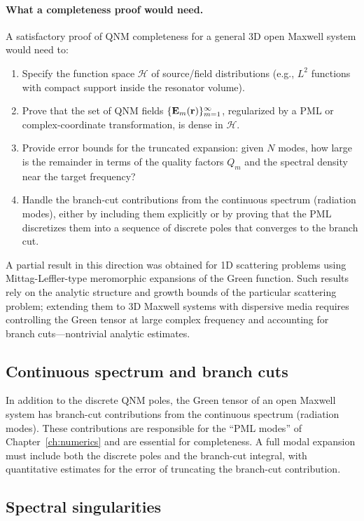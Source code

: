 \paragraph{What a completeness proof would need.}
A satisfactory proof of QNM completeness for a general 3D open Maxwell
system would need to:
\begin{enumerate}
 \item Specify the function space $\mathcal{H}$ of source/field
 distributions (e.g., $L^2$ functions with compact support inside
 the resonator volume).
 \item Prove that the set of QNM fields
 $\{\mathbf{E}_m(\mathbf{r})\}_{m=1}^{\infty}$, regularized by a PML or
 complex-coordinate transformation, is dense in $\mathcal{H}$.
 \item Provide error bounds for the truncated expansion: given $N$
 modes, how large is the remainder in terms of the quality
 factors $Q_m$ and the spectral density near the target
 frequency?
 \item Handle the branch-cut contributions from the continuous
 spectrum (radiation modes), either by including them explicitly
 or by proving that the PML discretizes them into a sequence
 of discrete poles that converges to the branch cut.
\end{enumerate}
A partial result in this direction was obtained for 1D scattering
problems using Mittag-Leffler-type meromorphic expansions of the Green
function. Such results rely on the analytic structure and growth bounds
of the particular scattering problem; extending them to 3D Maxwell
systems with dispersive media requires controlling the Green tensor at
large complex frequency and accounting for branch cuts---nontrivial
analytic estimates.

\subsection{Continuous spectrum and branch cuts}
\label{ssec:continuous-spectrum}

In addition to the discrete QNM poles, the Green tensor of an open
Maxwell system has branch-cut contributions from the continuous spectrum
(radiation modes). These contributions are responsible for the ``PML
modes'' of Chapter~\ref{ch:numerics} and are essential for completeness.
A full modal expansion must include both the discrete poles and the
branch-cut integral, with quantitative estimates for the error of
truncating the branch-cut contribution.

\subsection{Spectral singularities}
\label{ssec:spectral-singularities}

